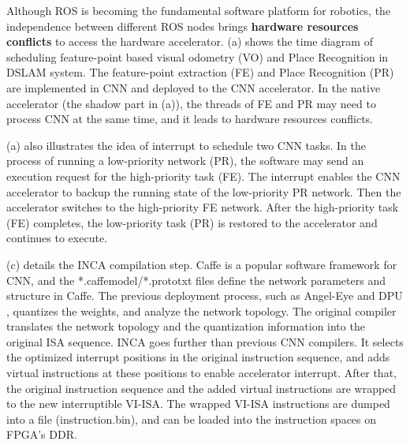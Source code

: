 



Although ROS is becoming the fundamental software platform for robotics, the independence between different ROS nodes brings \textbf{hardware resources conflicts} to access the hardware accelerator. (a) shows the time diagram of scheduling feature-point based visual odometry (VO) and Place Recognition in DSLAM system. The feature-point extraction (FE) and Place Recognition (PR) are implemented in CNN and deployed to the CNN accelerator. In the native accelerator (the shadow part in (a)), the threads of FE and PR may need to process CNN at the same time, and it leads to hardware resources conflicts. 

(a) also illustrates the idea of interrupt to schedule two CNN tasks. In the process of running a low-priority network (PR), the software may send an execution request for the high-priority task (FE). The interrupt enables the CNN accelerator to backup the running state of the low-priority PR network. Then the accelerator switches to the high-priority FE network. After the high-priority task (FE) completes, the low-priority task (PR) is restored to the accelerator and continues to execute.


(c) details the INCA compilation step. Caffe \cite{jia2014caffe} is a popular software framework for CNN, and the *.caffemodel/*.prototxt files define the network parameters and structure in Caffe. The previous deployment process, such as Angel-Eye \cite{guo2017angel} and DPU \cite{dpu}, quantizes the weights, and analyze the network topology. 
The original compiler translates the network topology and the quantization information into the original ISA sequence. INCA goes further than previous CNN compilers. 
It selects the optimized interrupt positions in the original instruction sequence, and adds virtual instructions at these positions to enable accelerator interrupt. After that, the original instruction sequence and the added virtual instructions are wrapped to the new interruptible VI-ISA. The wrapped VI-ISA instructions are dumped into a file (instruction.bin), and can be loaded into the instruction spaces on FPGA's DDR.


